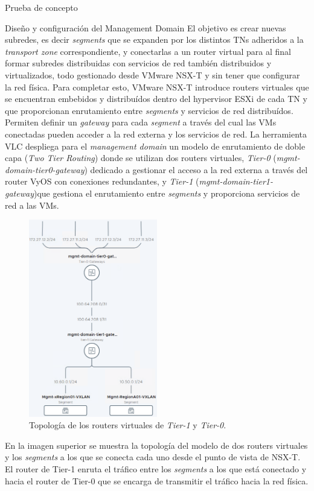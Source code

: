 \begin{section}{Prueba de concepto}
\begin{subsection}{Diseño y configuración del Management Domain}
    El objetivo es crear nuevas subredes, es decir \textit{segments} que se expanden por los distintos TNs adheridos a la \textit{transport zone} correspondiente, y conectarlas a un router virtual para al final formar subredes distribuidas con servicios de red también	distribuidos y virtualizados, todo gestionado desde VMware NSX-T y sin tener que configurar la red física. Para completar esto, VMware NSX-T introduce routers virtuales que se encuentran embebidos y distribuídos dentro del hypervisor ESXi de cada TN y que proporcionan enrutamiento entre \textit{segments} y servicios de red distribuídos. Permiten definir un \textit{gateway} para cada \textit{segment} a través del cual las VMs conectadas pueden acceder a la red externa y los servicios de red. La herramienta VLC despliega para el \textit{management domain} un modelo de enrutamiento de doble capa (\textit{Two Tier Routing}) donde se utilizan dos routers virtuales, \textit{Tier-0} (\textit{mgmt-domain-tier0-gateway}) dedicado a gestionar el acceso a la red externa a través del router VyOS con conexiones redundantes, y \textit{Tier-1} (\textit{mgmt-domain-tier1-gateway})que gestiona el enrutamiento entre \textit{segments} y proporciona servicios de red a las VMs.

    \begin{figure}[h]
      \centering
      \includegraphics[width=0.5\textwidth]{imaxes/pruebaconcepto/topologiaTwoTierRouting.png}
      \caption{Topología de los routers virtuales de \textit{Tier-1} y \textit{Tier-0}.}
      \label{fig:Topology-TwoTier-Routing-NSXT}
    \end{figure}
    \FloatBarrier
    En la imagen superior se muestra la topología del modelo de dos routers virtuales y los \textit{segments} a los que se conecta cada uno desde el punto de vista de NSX-T. El router de Tier-1 enruta el tráfico entre los \textit{segments} a los que está conectado y hacia el router de Tier-0 que se encarga de transmitir el tráfico hacia la red física.


\end{subsection}
\end{section}

